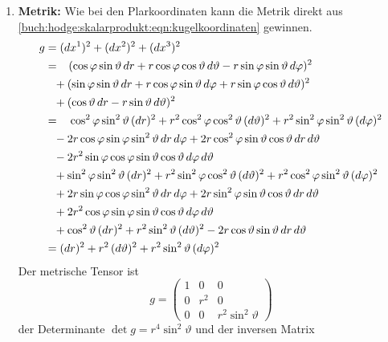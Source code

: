 \begin{enumerate}
\item {\bf Metrik:}
Wie bei den Plarkoordinaten kann die Metrik direkt aus 
\eqref{buch:hodge:skalarprodukt:eqn:kugelkoordinaten}
gewinnen.
\begin{align*}
g
&=
(dx^1)^2 + (dx^2)^2 + (dx^3)^2
\\
&=\phantom{+}
(
  \cos\varphi \sin\vartheta \,dr
+
r \cos\varphi \cos\vartheta \,d\vartheta
-
r \sin\varphi \sin\vartheta \,d\varphi
)^2
\\
&\phantom{=}\mathstrut+
(
  \sin\varphi \sin\vartheta \,dr
+
r \cos\varphi \sin\vartheta \,d\varphi
+
r \sin\varphi \cos\vartheta \,d\vartheta
)^2
\\
&\phantom{=}\mathstrut+
(
  \cos\vartheta \,dr
-
r \sin\vartheta \,d\vartheta
)^2
\\
&=\mathstrut\phantom{+}
\cos^2\varphi \sin^2\vartheta \, (dr)^2
+
r^2 \cos^2\varphi \cos^2\vartheta \, (d\vartheta)^2
+
r^2 \sin^2\varphi \sin^2\vartheta \, (d\varphi)^2
\\
&\phantom{=}\mathstrut-
2r \cos\varphi \sin\varphi \sin^2\vartheta \,dr\,d\varphi
+
2r \cos^2\varphi \sin\vartheta \cos\vartheta \,dr\,d\vartheta
\\
&\phantom{=}\mathstrut-
2r^2 \sin\varphi \cos\varphi \sin\vartheta \cos\vartheta \,d\varphi\,d\vartheta
\\
&\phantom{=}\mathstrut+
\sin^2\varphi\sin^2\vartheta \,(dr)^2
+
r^2\sin^2\varphi\cos^2\vartheta \,(d\vartheta)^2
+
r^2\cos^2\varphi\sin^2\vartheta \,(d\varphi)^2
\\
&\phantom{=}\mathstrut+
2r\sin\varphi\cos\varphi\sin^2\vartheta \,dr\,d\varphi
+
2r\sin^2\varphi\sin\vartheta\cos\vartheta \,dr\,d\vartheta
\\
&\phantom{=}\mathstrut+
2r^2\cos\varphi\sin\varphi\sin\vartheta\cos\vartheta \,d\varphi\,d\vartheta
\\
&\phantom{=}\mathstrut+
   \cos^2\vartheta \,(dr)^2
+
r^2 \sin^2\vartheta \,(d\vartheta)^2
-
2r \cos\vartheta \sin\vartheta \,dr\,d\vartheta
\\
&=
(dr)^2
+
r^2\, (d\vartheta)^2
+
r^2\sin^2\vartheta\,(d\varphi)^2
\end{align*}
Der metrische Tensor ist
\[
g
=
\begin{pmatrix}
1 &  0  &         0           \\
0 & r^2 &         0           \\
0 &  0  & r^2 \sin^2\vartheta
\end{pmatrix}
\]
der Determinante $\det g=r^4\sin^2\vartheta$ und der inversen Matrix

\end{enumerate}

